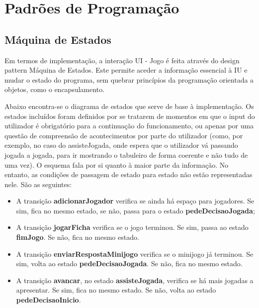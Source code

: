 \documentclass[11pt]{article}
\begin{document}
	\pagebreak
	
	\large
	\section{Padrões de Programação}
	\subsection{Máquina de Estados}
	\normalsize
	
	 Em termos de implementação, a interação UI - Jogo é feita através do design pattern Máquina de Estados. Este permite aceder a informação essencial à IU e mudar o estado do programa, sem quebrar princípios da programação orientada a objetos, como o encapsulamento.
	 
	 Abaixo encontra-se o diagrama de estados que serve de base à implementação. Os estados incluídos foram definidos por se tratarem de momentos em que o input do utilizador é obrigatório para a continuação do funcionamento, ou apenas por uma questão de compreensão de acontecimentos por parte do utilizador (como, por exemplo, no caso do assisteJogada, onde espera que o utilizador vá passando jogada a jogada, para ir mostrando o tabuleiro de forma coerente e não tudo de uma vez). O esquema fala por si quanto à maior parte da informação. No entanto, as condições de passagem de estado para estado não estão representadas nele. São as seguintes:
	 
	 \begin{itemize}
	 	\item A transição \textbf{adicionarJogador} verifica se ainda há espaço para jogadores. Se sim, fica no mesmo estado, se não, passa para o estado \textbf{pedeDecisaoJogada};
	 	\item A transição \textbf{jogarFicha} verifica se o jogo terminou. Se sim, passa ao estado \textbf{fimJogo}. Se não, fica no mesmo estado.
	 	\item A transição \textbf{enviarRespostaMinijogo} verifica se o minijogo já terminou. Se sim, volta ao estado \textbf{pedeDecisaoJogada}. Se não, fica no mesmo estado.
	 	\item A transição \textbf{avancar}, no estado \textbf{assisteJogada}, verifica se há mais jogadas a apresentar. Se sim, fica no mesmo estado. Se não, volta ao estado \textbf{pedeDecisaoInicio}.
	 \end{itemize}
	 
\end{document}

